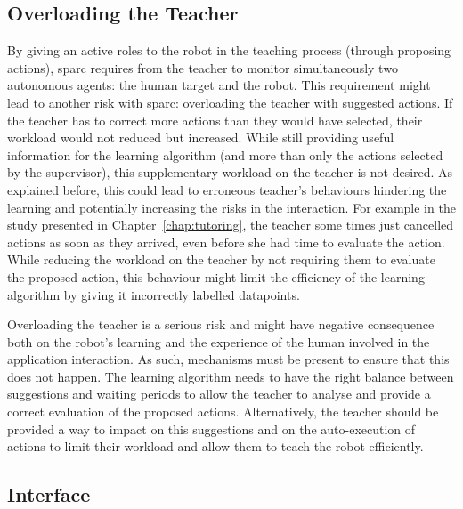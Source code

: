 \subsection{Overloading the Teacher}


By giving an active roles to the robot in the teaching process (through proposing actions), \gls{sparc} requires from the teacher to  monitor simultaneously two autonomous agents: the human target and the robot. This requirement might lead to another risk with \gls{sparc}: overloading the teacher with suggested actions. If the teacher has to correct more actions than they would have selected, their workload would not reduced but increased. While still providing useful information for the learning algorithm (and more than only the actions selected by the supervisor), this supplementary workload on the teacher is not desired. As explained before, this could lead to erroneous teacher's behaviours hindering the learning and potentially increasing the risks in the interaction. For example in the study presented in Chapter~\ref{chap:tutoring}, the teacher some times just cancelled actions as soon as they arrived, even before she had time to evaluate the action. While reducing the workload on the teacher by not requiring them to evaluate the proposed action, this behaviour might limit the efficiency of the learning algorithm by giving it incorrectly labelled datapoints. 

Overloading the teacher is a serious risk and might have negative consequence both on the robot's learning and the experience of the human involved in the application interaction. As such, mechanisms must be present to ensure that this does not happen. The learning algorithm needs to have the right balance between suggestions and waiting periods to allow the teacher to analyse and provide a correct evaluation of the proposed actions. Alternatively, the teacher should be provided a way to impact on this suggestions and on the auto-execution of actions to limit their workload and allow them to teach the robot efficiently.

\subsection{Interface}\label{sec:disc_lim_interface}

